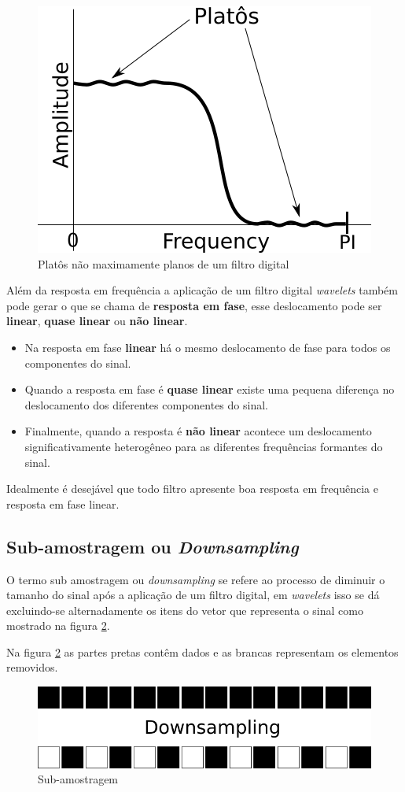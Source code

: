 \begin{myenv}{1.5}
				\begin{figure}[h]
					\centering
					\includegraphics[width=0.3\linewidth]{images/noMaximallyFlat}
					\caption{Platôs não maximamente planos de um filtro digital}
					\label{fig:nomaximallyflat}
				\end{figure}
			
				\par Além da resposta em frequência a aplicação de um filtro digital \textit{wavelets} também pode gerar o que se chama de \textbf{resposta em fase}, esse deslocamento pode ser \textbf{linear}, \textbf{quase linear} ou \textbf{não linear}. 
				
				\begin{itemize}
					\item Na resposta em fase \textbf{linear} há o mesmo deslocamento de fase para todos os componentes do sinal.
					\item Quando a resposta em fase é \textbf{quase linear} existe uma pequena diferença no deslocamento dos diferentes componentes do sinal.
					\item Finalmente, quando a resposta é \textbf{não linear} acontece um deslocamento significativamente heterogêneo para as diferentes frequências formantes do sinal.
					\end{itemize}
				
				\par Idealmente é desejável que todo filtro apresente boa resposta em frequência e resposta em fase linear.
				
			
			\subsection{Sub-amostragem ou \textit{Downsampling}}
				\par O termo sub amostragem ou \textit{downsampling} se refere ao processo de diminuir o tamanho do sinal após a aplicação de um  filtro digital, em \textit{wavelets} isso se dá excluindo-se alternadamente os itens do vetor que representa o sinal como mostrado na figura \ref{fig:downsampling}.
				
				\par Na figura \ref{fig:downsampling} as partes pretas contêm dados e as brancas representam os elementos removidos.
				\begin{figure}[h]
					\centering
					\includegraphics[width=0.7\linewidth]{images/downsampling}
					\caption{Sub-amostragem}
					\label{fig:downsampling}
				\end{figure}


\end{myenv}
